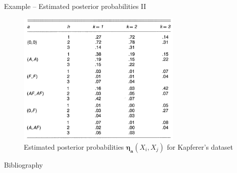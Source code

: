 \documentclass[aspectratio=169,xcolor=dvipsnames]{beamer}
\newcommand{\veca}{\boldsymbol{a}}
\newcommand{\veceta}{\boldsymbol{\eta}}
\begin{document}
\begin{frame}{Example – Estimated posterior probabilities II}
\begin{figure}
    \centering
    \includegraphics[keepaspectratio, height = 6.5cm]{utilities/exp_eta.png}
    \caption{Estimated posterior probabilities $\veceta_{\veca}(X_i,X_j)$ for Kapferer's dataset}
    \label{fig:3}
\end{figure}
    
\end{frame}

\begin{frame}[allowframebreaks]{Bibliography}

\nocite{nowicki_snijders_2001, nowicki_snijders_1997}

\end{frame}


\end{document}
